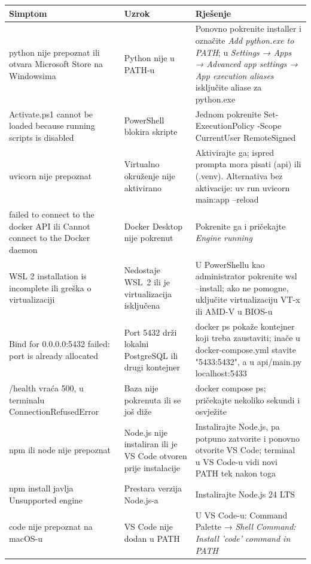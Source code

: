 \documentclass[11pt,a4paper]{article}
\newcommand{\code}[1]{{\ttfamily\small #1}}
\newcommand{\zaglavlje}{\rowcolor{tint}}
\begin{document}
\begin{center}\small
\begin{tabularx}{\linewidth}{P{4.6cm}P{3.6cm}L}
\toprule
\zaglavlje \textbf{Simptom} & \textbf{Uzrok} & \textbf{Rješenje}\\
\midrule
\code{python} nije prepoznat ili otvara Microsoft Store na Windowsima & Python nije u PATH-u &
  Ponovno pokrenite installer i označite \emph{Add python.exe to PATH}; u \emph{Settings →
  Apps → Advanced app settings → App execution aliases} isključite aliase za \code{python.exe}\\
\code{Activate.ps1 cannot be loaded because running scripts is disabled} & PowerShell blokira skripte &
  Jednom pokrenite \code{Set-ExecutionPolicy -Scope CurrentUser RemoteSigned}\\
\code{uvicorn} nije prepoznat & Virtualno okruženje nije aktivirano &
  Aktivirajte ga; ispred prompta mora pisati \code{(api)} ili \code{(.venv)}. Alternativa
  bez aktivacije: \code{uv run uvicorn main:app --reload}\\
\code{failed to connect to the docker API} ili \code{Cannot connect to the Docker daemon} &
  Docker Desktop nije pokrenut & Pokrenite ga i pričekajte \emph{Engine running}\\
\code{WSL 2 installation is incomplete} ili greška o virtualizaciji &
  Nedostaje WSL~2 ili je virtualizacija isključena &
  U PowerShellu kao administrator pokrenite \code{wsl --install}; ako ne pomogne, uključite
  virtualizaciju VT-x ili AMD-V u BIOS-u\\
\code{Bind for 0.0.0.0:5432 failed: port is already allocated} &
  Port 5432 drži lokalni PostgreSQL ili drugi kontejner &
  \code{docker ps} pokaže kontejner koji treba zaustaviti; inače u \code{docker-compose.yml}
  stavite \code{"5433:5432"}, a u \code{api/main.py} \code{localhost:5433}\\
\code{/health} vraća 500, u terminalu \code{ConnectionRefusedError} &
  Baza nije pokrenuta ili se još diže &
  \code{docker compose ps}; pričekajte nekoliko sekundi i osvježite\\
\code{npm} ili \code{node} nije prepoznat &
  Node.js nije instaliran ili je VS Code otvoren prije instalacije &
  Instalirajte Node.js, pa potpuno zatvorite i ponovno otvorite VS Code; terminal
  u VS Code-u vidi novi PATH tek nakon toga\\
\code{npm install} javlja \code{Unsupported engine} & Prestara verzija Node.js-a &
  Instalirajte Node.js 24 LTS\\
\code{code} nije prepoznat na macOS-u & VS Code nije dodan u PATH &
  U VS Code-u: Command Palette → \emph{Shell Command: Install 'code' command in PATH}\\
\bottomrule
\end{tabularx}
\end{center}
\end{document}
